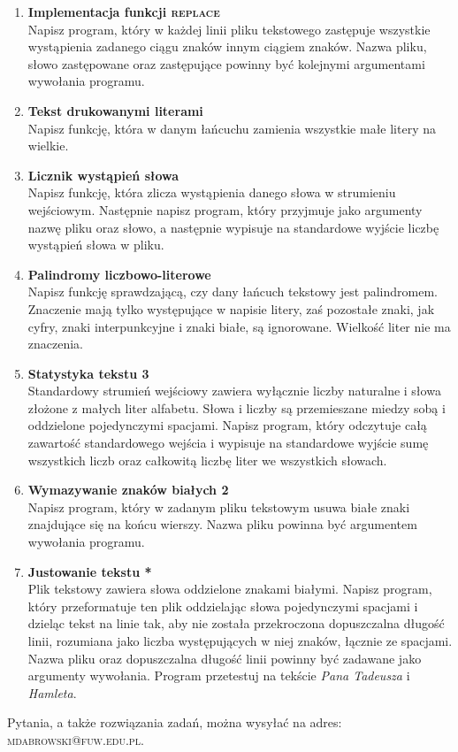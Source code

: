 \documentclass[12pt]{article}
\begin{document}
\begin{enumerate}
\item \textbf{Implementacja funkcji \textsc{replace}}\\
Napisz program, który w każdej linii pliku tekstowego zastępuje wszystkie wystąpienia zadanego ciągu znaków innym ciągiem znaków. Nazwa pliku, słowo zastępowane oraz zastępujące powinny być kolejnymi argumentami wywołania programu.

\newpage
{}

\item \textbf{Tekst drukowanymi literami}\\
Napisz funkcję, która w danym łańcuchu zamienia wszystkie małe litery na wielkie.

\item \textbf{Licznik wystąpień słowa}\\
Napisz funkcję, która zlicza wystąpienia danego słowa w strumieniu wejściowym. Następnie napisz program, który przyjmuje jako argumenty nazwę pliku oraz słowo, a następnie wypisuje na standardowe wyjście liczbę wystąpień słowa w pliku.

\item \textbf{Palindromy liczbowo-literowe}\\
Napisz funkcję sprawdzającą, czy dany łańcuch tekstowy jest palindromem. Znaczenie mają tylko występujące w napisie litery, zaś pozostałe znaki, jak cyfry, znaki interpunkcyjne i znaki białe, są ignorowane. Wielkość liter nie ma znaczenia.

\item \textbf{Statystyka tekstu 3}\\
Standardowy strumień wejściowy zawiera wyłącznie liczby naturalne i słowa złożone z małych liter alfabetu. Słowa i liczby są przemieszane miedzy sobą i oddzielone pojedynczymi spacjami. Napisz program, który odczytuje całą zawartość standardowego wejścia i wypisuje na standardowe wyjście sumę wszystkich liczb oraz całkowitą liczbę liter we wszystkich słowach.

\item \textbf{Wymazywanie znaków białych 2}\\
Napisz program, który w zadanym pliku tekstowym usuwa białe znaki znajdujące się na końcu wierszy. Nazwa pliku powinna być argumentem wywołania programu.

\item \textbf{Justowanie tekstu *}\\
Plik tekstowy zawiera słowa oddzielone znakami białymi. Napisz program, który przeformatuje ten plik oddzielając słowa pojedynczymi spacjami i dzieląc tekst na linie tak, aby nie została przekroczona dopuszczalna długość linii, rozumiana jako liczba występujących w niej znaków, łącznie ze spacjami. Nazwa pliku oraz dopuszczalna długość linii powinny być zadawane jako argumenty wywołania. Program przetestuj na tekście \textit{Pana Tadeusza} i \textit{Hamleta}.

\end{enumerate}
\vspace{1cm}
\small Pytania, a także rozwiązania zadań, można wysyłać na adres: \textsc{mdabrowski@fuw.edu.pl}.
\end{document}
